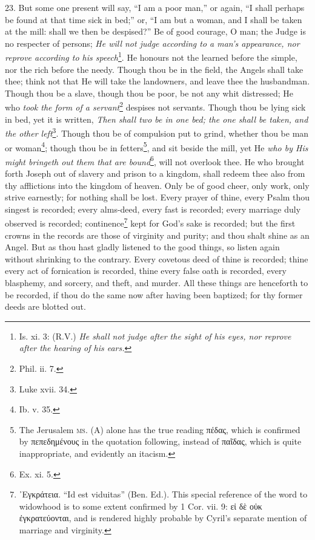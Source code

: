 23. But some one present will say, “I am a poor man,” or again, “I shall perhaps be found at that time sick in bed;” or, “I am but a woman, and I shall be taken at the mill: shall we then be despised?” Be of good courage, O man; the Judge is no respecter of persons; \emph{He will not judge according to a man’s appearance, nor reprove according to his speech}\footnote{Is. xi. 3: (R.V.) \emph{He shall not judge after the sight of his eyes, nor reprove after the hearing of his ears.}}. He honours not the learned before the simple, nor the rich before the needy. Though thou be in the field, the Angels shall take thee; think not that He will take the landowners, and leave thee the husbandman. Though thou be a slave, though thou be poor, be not any whit distressed; He who \emph{took the form of a servant}\footnote{Phil. ii. 7.} despises not servants. Though thou be lying sick in bed, yet it is written, \emph{Then shall two be in one bed; the one shall be taken, and the other left}\footnote{Luke xvii. 34.}. Though thou be of compulsion put to grind, whether thou be man or woman\footnote{Ib. v. 35.}; though thou be in fetters\footnote{The Jerusalem \textsc{ms.} (A) alone has the true reading \textgreek{πέδας}, which is confirmed by \textgreek{πεπεδημένους} in the quotation following, instead of \textgreek{παῖδας}, which is quite inappropriate, and evidently an itacism.}, and sit beside the mill, yet He \emph{who by His might bringeth out them that are bound}\footnote{Ex. xi. 5.}, will not overlook thee. He who brought forth Joseph out of slavery and prison to a kingdom, shall redeem thee also from thy afflictions into the kingdom of heaven. Only be of good cheer, only work, only strive earnestly; for nothing shall be lost. Every prayer of thine, every Psalm thou singest is recorded; every alms-deed, every fast is recorded; every marriage duly observed is recorded; continence\footnote{\textgreek{᾽Εγκράτεια}. “Id est viduitas” (Ben. Ed.). This special reference of the word to widowhood is to some extent confirmed by 1 Cor. vii. 9: \textgreek{εἰ δὲ οὐκ ἐγκρατεύονται}, and is rendered highly probable by Cyril’s separate mention of marriage and virginity.} kept for God’s sake is recorded; but the first crowns in the records are those of virginity and purity; and thou shalt shine as an Angel. But as thou hast gladly listened to the good things, so listen again without shrinking to the contrary. Every covetous deed of thine is recorded; thine every act of fornication is recorded, thine every false oath is recorded, every blasphemy, and sorcery, and theft, and murder. All these things are henceforth to be recorded, if thou do the same now after having been baptized; for thy former deeds are blotted out.

